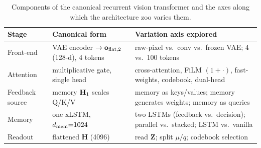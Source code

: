 \begin{table}[t]
\centering
\caption{Components of the canonical recurrent vision transformer and the axes along which
the architecture zoo varies them.}
\label{tab:components}
\small
\begin{tabular}{p{2.6cm}p{4.6cm}p{5.4cm}}
\toprule
Stage & Canonical form & Variation axis explored \\
\midrule
Front-end & VAE encoder $\to\mathbf{o}_{\text{flat,2}}$ (128-d), 4 tokens & raw-pixel vs.\ conv vs.\ frozen
VAE; 4 vs.\ 100 tokens \\
Attention & multiplicative gate, single head & cross-attention, FiLM $(1{+}\cdot)$,
fast-weights, codebook, dual-head \\
Feedback source & memory $\mathbf{H}_1$ scales Q/K/V & memory as keys/values; memory generates
weights; memory as queries \\
Memory & one xLSTM, $d_{\text{mem}}{=}1024$ & two LSTMs (feedback vs.\ decision); parallel vs.\
stacked; LSTM vs.\ vanilla \\
Readout & flattened $\mathbf H$ (4096) & read $\mathbf Z$; split $\mu/q$; codebook
selection \\
\bottomrule
\end{tabular}
\end{table}
